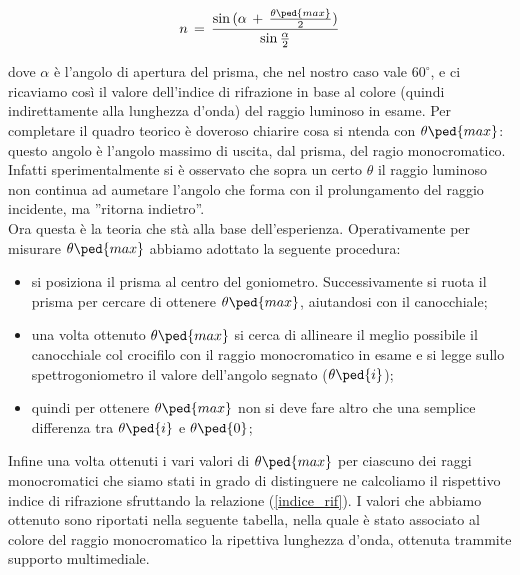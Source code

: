\begin{equation}
	n \,=\, \frac{\sin{(\alpha\,+\,\frac{\theta\ped{max}}{2})}}{\sin{\frac{\alpha}{2}}}
	\label{indice_rif}
\end{equation}

dove $\alpha$ è l'angolo di apertura del prisma, che nel nostro caso vale $60^\circ$, e ci ricaviamo così il valore dell'indice di rifrazione in base al colore (quindi indirettamente alla lunghezza d'onda) del raggio luminoso in esame.
Per completare il quadro teorico è doveroso chiarire cosa si ntenda con $\theta\ped{max}$: questo angolo è l'angolo massimo di uscita, dal prisma, del ragio monocromatico. Infatti sperimentalmente si è osservato che sopra un certo $\theta$ il raggio luminoso non continua ad aumetare l'angolo che forma con il prolungamento del raggio incidente, ma ''ritorna indietro''.\\

Ora questa è la teoria che stà alla base dell'esperienza. Operativamente per misurare $\theta\ped{max}$ abbiamo adottato la seguente procedura:

\begin{itemize}
	\item{si posiziona il prisma al centro del goniometro. Successivamente si ruota il prisma per cercare di ottenere $\theta\ped{max}$, aiutandosi con il canocchiale;}
	\item{una volta ottenuto $\theta\ped{max}$ si cerca di allineare il meglio possibile il canocchiale col crocifilo con il raggio monocromatico in esame e si legge sullo spettrogoniometro il valore dell'angolo segnato ($\theta\ped{i}$);}
	\item{quindi per ottenere $\theta\ped{max}$ non si deve fare altro che una semplice differenza tra $\theta\ped{i}$ e $\theta\ped{0}$;}
\end{itemize}

Infine una volta ottenuti i vari valori di $\theta\ped{max}$ per ciascuno dei raggi monocromatici che siamo stati in grado di distinguere ne calcoliamo il rispettivo indice di rifrazione sfruttando la relazione (\ref{indice_rif}). I valori che abbiamo ottenuto sono riportati nella seguente tabella, nella quale è stato associato al colore del raggio monocromatico la ripettiva lunghezza d'onda, ottenuta trammite supporto multimediale.



